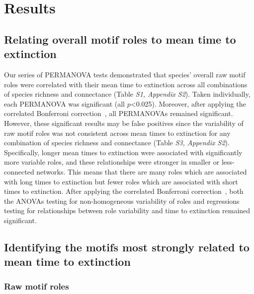 \documentclass[12pt]{article}
\begin{document}
\section*{Results}
	
    \subsection*{Relating overall motif roles to mean time to extinction}
    
		Our series of PERMANOVA tests demonstrated that species' overall raw motif roles were correlated with their mean time to extinction across all combinations of species richness and connectance (Table \emph{S1, Appendix S2}). Taken individually, each PERMANOVA was significant (all $p$\textless0.025). Moreover, after applying the correlated Bonferroni correction~\citep{Drezner2016}, all PERMANOVAs remained significant.
		However, these significant results may be false positives since the variability of raw motif roles was not consistent across mean times to extinction for any combination of species richness and connectance (Table \emph{S3, Appendix S2}). 
		Specifically, longer mean times to extinction were associated with significantly more variable roles, and these relationships were stronger in smaller or less-connected networks. 
		This means that there are many roles which are associated with long times to extinction but fewer roles which are associated with short times to extinction.
		After applying the correlated Bonferroni correction~\citep{Drezner2016}, both the ANOVAs testing for non-homogeneous variability of roles and regressions testing for relationships between role variability and time to extinction remained significant.
    

	\subsection*{Identifying the motifs most strongly related to mean time to extinction}

        \subsubsection*{Raw motif roles}
        
\end{document}
